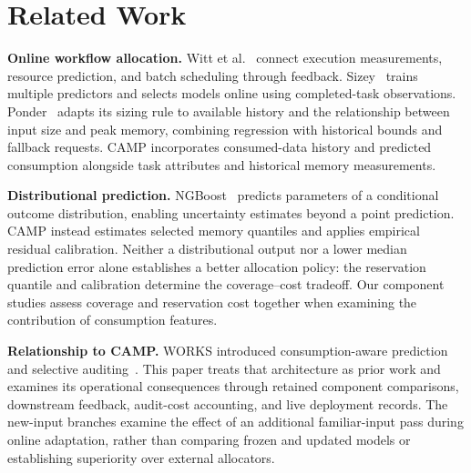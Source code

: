 \section{Related Work}
\label{sec:related}
\textbf{Online workflow allocation.}
Witt et al.~\cite{witt2019feedback} connect execution measurements,
resource prediction, and batch scheduling through feedback.
Sizey~\cite{bader2024sizey} trains multiple predictors and selects models
online using completed-task observations. Ponder~\cite{lehmann2024ponder}
adapts its sizing rule to available history and the relationship between
input size and peak memory, combining regression with historical bounds
and fallback requests. CAMP incorporates consumed-data history and predicted
consumption alongside task attributes and historical memory measurements.

\textbf{Distributional prediction.}
NGBoost~\cite{duan2020ngboost} predicts parameters of a conditional outcome
distribution, enabling uncertainty estimates beyond a point prediction.
CAMP instead estimates selected memory quantiles and applies empirical
residual calibration. Neither a distributional output nor a lower median
prediction error alone establishes a better allocation policy: the
reservation quantile and calibration determine the coverage--cost
tradeoff. Our component studies assess coverage and reservation cost together
when examining the contribution of consumption features.

\textbf{Relationship to CAMP.}
WORKS introduced consumption-aware prediction and selective
auditing~\cite{camp2026works}. This paper treats that architecture as
prior work and examines its operational consequences through retained
component comparisons, downstream feedback, audit-cost accounting, and
live deployment records. The new-input branches examine the effect of an additional familiar-input
pass during online adaptation, rather than comparing frozen and updated
models or establishing superiority over external allocators.
